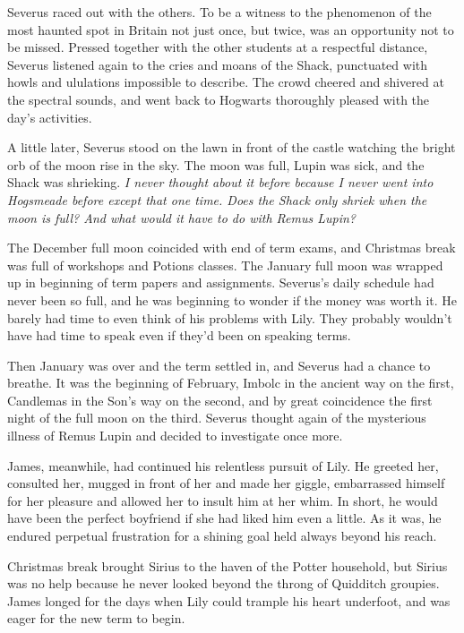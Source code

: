 Severus raced out with the others. To be a witness to the phenomenon of the most haunted spot in Britain not just once, but twice, was an opportunity not to be missed. Pressed together with the other students at a respectful distance, Severus listened again to the cries and moans of the Shack, punctuated with howls and ululations impossible to describe. The crowd cheered and shivered at the spectral sounds, and went back to Hogwarts thoroughly pleased with the day's activities.

A little later, Severus stood on the lawn in front of the castle watching the bright orb of the moon rise in the sky. The moon was full, Lupin was sick, and the Shack was shrieking. \emph{I never thought about it before because I never went into Hogsmeade before except that one time. Does the Shack only shriek when the moon is full? And what would it have to do with Remus Lupin?}

The December full moon coincided with end of term exams, and Christmas break was full of workshops and Potions classes. The January full moon was wrapped up in beginning of term papers and assignments. Severus's daily schedule had never been so full, and he was beginning to wonder if the money was worth it. He barely had time to even think of his problems with Lily. They probably wouldn't have had time to speak even if they'd been on speaking terms.

Then January was over and the term settled in, and Severus had a chance to breathe. It was the beginning of February, Imbolc in the ancient way on the first, Candlemas in the Son's way on the second, and by great coincidence the first night of the full moon on the third. Severus thought again of the mysterious illness of Remus Lupin and decided to investigate once more.

James, meanwhile, had continued his relentless pursuit of Lily. He greeted her, consulted her, mugged in front of her and made her giggle, embarrassed himself for her pleasure and allowed her to insult him at her whim. In short, he would have been the perfect boyfriend if she had liked him even a little. As it was, he endured perpetual frustration for a shining goal held always beyond his reach.

Christmas break brought Sirius to the haven of the Potter household, but Sirius was no help because he never looked beyond the throng of Quidditch groupies. James longed for the days when Lily could trample his heart underfoot, and was eager for the new term to begin.

